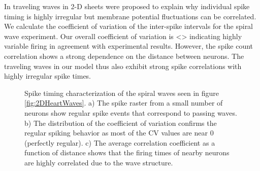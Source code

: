 In \citet{keane2015} traveling waves in 2-D sheets were proposed to explain why individual spike timing is highly irregular 
but membrane potential fluctuations can be correlated.
We calculate the coefficient of variation of the inter-spike intervals for the spiral wave experiment.
Our overall coefficient of variation is <> indicating highly variable firing in agreement with experimental results.
However, the spike count correlation shows a strong dependence on the distance between neurons.
The traveling waves in our model thus also exhibit strong spike correlations with highly irregular spike times.
\begin{figure}[!htb]
 \caption{Spike timing characterization of the spiral waves seen in figure \ref{fig:2DHeartWaves}.
          a) The spike raster from a small number of neurons show regular spike events that correspond to passing waves.
          b) The distribution of the coefficient of variation confirms the regular spiking behavior as most of the CV values are near 0 (perfectly regular).
          c) The average correlation coefficient as a function of distance shows that the firing times of nearby neurons are highly correlated due to the wave structure.
          } 
 \label{fig:2DSpiralWave_SpikeTiming}
\end{figure}
 \FloatBarrier
 

